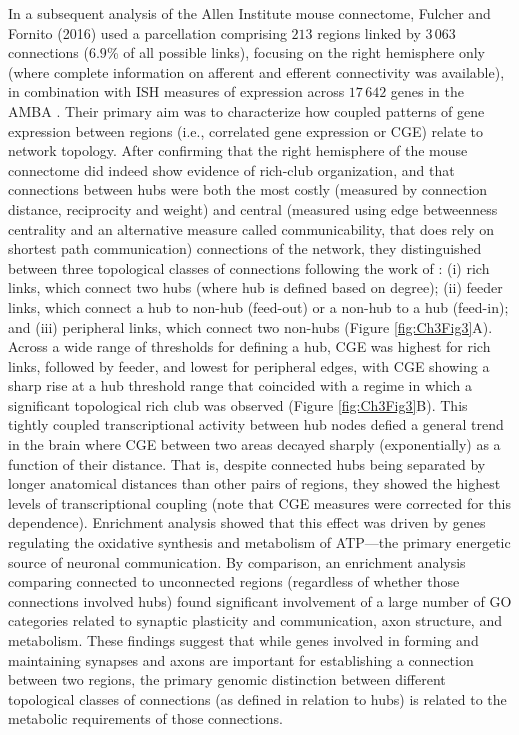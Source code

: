 In a subsequent analysis of the Allen Institute mouse connectome, Fulcher and Fornito (2016) used a parcellation comprising $213$ regions linked by $3\,063$ connections ($6.9$\% of all possible links), focusing on the right hemisphere only (where complete information on afferent and efferent connectivity was available), in combination with ISH measures of expression across $17\,642$ genes in the AMBA \citep{Lein2007a}.
Their primary aim was to characterize how coupled patterns of gene expression between regions (i.e., correlated gene expression or CGE) relate to network topology. After confirming that the right hemisphere of the mouse connectome did indeed show evidence of rich-club organization, and that connections between hubs were both the most costly (measured by connection distance, reciprocity and weight) and central (measured using edge betweenness centrality and an alternative measure called communicability, that does rely on shortest path communication) connections of the network, they distinguished between three topological classes of connections following the work of \citet{VandenHeuvel2012}: (i) rich links, which connect two hubs (where hub is defined based on degree); (ii) feeder links, which connect a hub to non-hub (feed-out) or a non-hub to a hub (feed-in);
and (iii) peripheral links, which connect two non-hubs (Figure \ref{fig:Ch3Fig3}A).
Across a wide range of thresholds for defining a hub, CGE was highest for rich links, followed by feeder, and lowest for peripheral edges, with CGE showing a sharp rise at a hub threshold range that coincided with a regime in which a significant topological rich club was observed (Figure \ref{fig:Ch3Fig3}B). This tightly coupled transcriptional activity between hub nodes defied a general trend in the brain where CGE between two areas decayed sharply (exponentially) as a function of their distance. That is, despite connected hubs being separated by longer anatomical distances than other pairs of regions, they showed the highest levels of transcriptional coupling (note that CGE measures were corrected for this dependence).
Enrichment analysis showed that this effect was driven by genes regulating the oxidative synthesis and metabolism of ATP---the primary energetic source of neuronal communication. By comparison, an enrichment analysis comparing connected to unconnected regions (regardless of whether those connections involved hubs) found significant involvement of a large number of GO categories related to synaptic plasticity and communication, axon structure, and metabolism. These findings suggest that while genes involved in forming and maintaining synapses and axons are important for establishing a connection between two regions, the primary genomic distinction between different topological classes of connections (as defined in relation to hubs) is related to the metabolic requirements of those connections.

